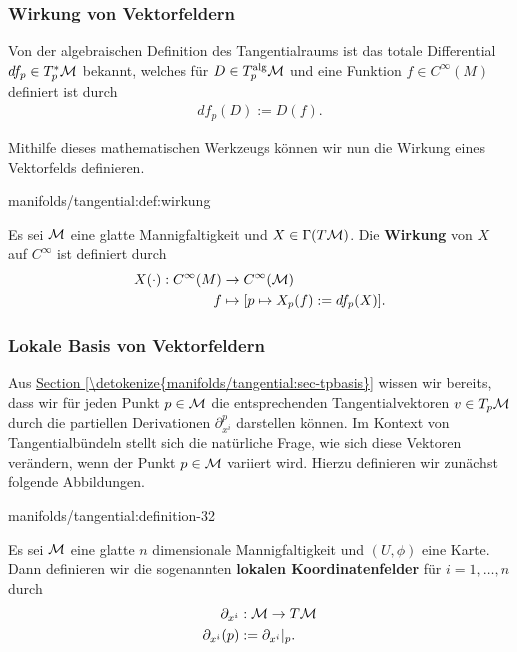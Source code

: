 \subsubsection{Wirkung von Vektorfeldern}
\label{\detokenize{manifolds/tangential:wirkung-von-vektorfeldern}}
\par
Von der algebraischen Definition des Tangentialraums ist das totale Differential \(df_p\in T^\ast_p\mathcal{M}\) bekannt, welches für \(D\in T^{\text{alg}}_p\mathcal{M}\) und eine Funktion \(f\in C^\infty(M)\) definiert ist durch
\begin{align*}
df_p(D):= D(f).
\end{align*}
\par
Mithilfe dieses mathematischen Werkzeugs können wir nun die Wirkung eines Vektorfelds definieren.
\begin{definition}{}{manifolds/tangential:def:wirkung}



\par
Es sei \(\mathcal{M}\) eine glatte Mannigfaltigkeit und \(X\in\Gamma(T\mathcal{M})\).
Die \textbf{Wirkung} von \(X\) auf \(C^\infty\) ist definiert durch
\begin{align*}
X(\cdot):C^\infty(M) &\to C^\infty(\mathcal{M})\\
f &\mapsto [p\mapsto X_p(f) := df_p(X)].
\end{align*}\end{definition}


\subsubsection{Lokale Basis von Vektorfeldern}
\label{\detokenize{manifolds/tangential:lokale-basis-von-vektorfeldern}}
\par
Aus \hyperref[\detokenize{manifolds/tangential:sec-tpbasis}]{Section \ref{\detokenize{manifolds/tangential:sec-tpbasis}}} wissen wir bereits, dass wir für jeden Punkt \(p\in\mathcal{M}\) die entsprechenden Tangentialvektoren \(v\in T_p\mathcal{M}\) durch die partiellen Derivationen \(\partial_{x^i}^p\) darstellen können.
Im Kontext von Tangentialbündeln stellt sich die natürliche Frage, wie sich diese Vektoren verändern, wenn der Punkt \(p\in\mathcal{M}\) variiert wird.
Hierzu definieren wir zunächst folgende Abbildungen.
\begin{definition}{}{manifolds/tangential:definition-32}



\par
Es sei \(\mathcal{M}\) eine glatte \(n\) dimensionale Mannigfaltigkeit und \((U,\phi)\) eine Karte.
Dann definieren wir die sogenannten \textbf{lokalen Koordinatenfelder} für \(i=1,\ldots,n\) durch
\begin{align*}
\partial_{x^{i}}&:\mathcal{M}\to T\mathcal{M}\\
\partial_{x^{i}}(p)&:= \partial_{x^{i}}\rvert_p.\end{align*}\end{definition}

